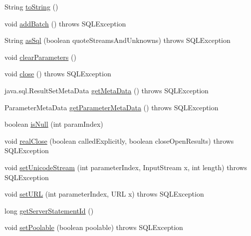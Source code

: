 \begin{DoxyCompactItemize}
\item 
String \mbox{\hyperlink{classcom_1_1mysql_1_1cj_1_1jdbc_1_1_server_prepared_statement_ad5257b893d43fe2f8947c7679cbb9c34}{to\+String}} ()
\item 
void \mbox{\hyperlink{classcom_1_1mysql_1_1cj_1_1jdbc_1_1_server_prepared_statement_a5ac31a5996a362e4b40de25d4d1325dd}{add\+Batch}} ()  throws S\+Q\+L\+Exception 
\item 
String \mbox{\hyperlink{classcom_1_1mysql_1_1cj_1_1jdbc_1_1_server_prepared_statement_a629795caf6aeaf5c11e5c580de863bf7}{as\+Sql}} (boolean quote\+Streams\+And\+Unknowns)  throws S\+Q\+L\+Exception 
\item 
void \mbox{\hyperlink{classcom_1_1mysql_1_1cj_1_1jdbc_1_1_server_prepared_statement_a092c5dd43061dcfc50ab84740ff545c5}{clear\+Parameters}} ()
\item 
void \mbox{\hyperlink{classcom_1_1mysql_1_1cj_1_1jdbc_1_1_server_prepared_statement_abc26fe33d6a4b5ae00f85a355b6b7171}{close}} ()  throws S\+Q\+L\+Exception 
\item 
java.\+sql.\+Result\+Set\+Meta\+Data \mbox{\hyperlink{classcom_1_1mysql_1_1cj_1_1jdbc_1_1_server_prepared_statement_aefecf860aaca8eb21a3ffbe775225e56}{get\+Meta\+Data}} ()  throws S\+Q\+L\+Exception 
\item 
Parameter\+Meta\+Data \mbox{\hyperlink{classcom_1_1mysql_1_1cj_1_1jdbc_1_1_server_prepared_statement_a1ec384c481db546d02f6d9517bd3a1e5}{get\+Parameter\+Meta\+Data}} ()  throws S\+Q\+L\+Exception 
\item 
boolean \mbox{\hyperlink{classcom_1_1mysql_1_1cj_1_1jdbc_1_1_server_prepared_statement_a15d2854a9fb7f6c31acc873ca4d5ead8}{is\+Null}} (int param\+Index)
\item 
void \mbox{\hyperlink{classcom_1_1mysql_1_1cj_1_1jdbc_1_1_server_prepared_statement_a1bc3e61ca02b73fbbdcc74c8528b41eb}{real\+Close}} (boolean called\+Explicitly, boolean close\+Open\+Results)  throws S\+Q\+L\+Exception 
\item 
void \mbox{\hyperlink{classcom_1_1mysql_1_1cj_1_1jdbc_1_1_server_prepared_statement_a514b9066383c6b783ce5c7db9cd43e0f}{set\+Unicode\+Stream}} (int parameter\+Index, Input\+Stream x, int length)  throws S\+Q\+L\+Exception 
\item 
void \mbox{\hyperlink{classcom_1_1mysql_1_1cj_1_1jdbc_1_1_server_prepared_statement_a6ce630e098838eb3f9184c7dc2673c59}{set\+U\+RL}} (int parameter\+Index, U\+RL x)  throws S\+Q\+L\+Exception 
\item 
long \mbox{\hyperlink{classcom_1_1mysql_1_1cj_1_1jdbc_1_1_server_prepared_statement_a62521a9884c5d55a8853b0397e89968b}{get\+Server\+Statement\+Id}} ()
\item 
void \mbox{\hyperlink{classcom_1_1mysql_1_1cj_1_1jdbc_1_1_server_prepared_statement_a30b4b80c8969b8f8d99f39cfe9df753f}{set\+Poolable}} (boolean poolable)  throws S\+Q\+L\+Exception 
\end{DoxyCompactItemize}
